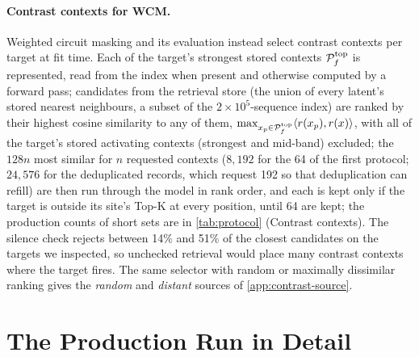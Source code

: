 \documentclass[10pt]{article}
\begin{document}
\paragraph{Contrast contexts for WCM.}
Weighted circuit masking and its evaluation instead select contrast contexts per target at fit time.
Each of the target's strongest stored contexts $\mathcal{P}_f^{\mathrm{top}}$ is represented, read from the index when present and otherwise computed by a forward pass; candidates from the retrieval store (the union of every latent's stored nearest neighbours, a subset of the $2\times10^5$-sequence index) are ranked by their highest cosine similarity to any of them, $\max_{x_p \in \mathcal{P}_f^{\mathrm{top}}} \langle r(x_p), r(x) \rangle$, with all of the target's stored activating contexts (strongest and mid-band) excluded; the $128n$ most similar for $n$ requested contexts ($8{,}192$ for the 64 of the first protocol; $24{,}576$ for the deduplicated records, which request 192 so that deduplication can refill) are then run through the model in rank order, and each is kept only if the target is outside its site's Top-K at every position, until 64 are kept; the production counts of short sets are in \cref{tab:protocol} (Contrast contexts).
The silence check rejects between 14\% and 51\% of the closest candidates on the targets we inspected, so unchecked retrieval would place many contrast contexts where the target fires.
The same selector with random or maximally dissimilar ranking gives the \emph{random} and \emph{distant} sources of \cref{app:contrast-source}.

\FloatBarrier
{}

\section{The Production Run in Detail}
\label{app:production}
\end{document}
